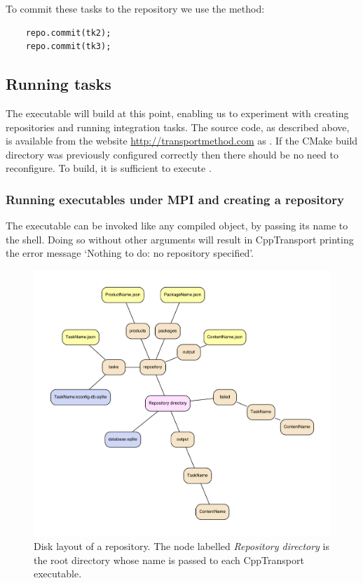 \documentclass[11pt,a4paper]{article}
\renewcommand{\texttt}[1]{{\ttfamily\fontseries{l}\selectfont{#1}}}
\newcommand{\packagefont}{\sffamily}
\newcommand{\CppTransport}{{\packagefont CppTransport}}
\newcommand{\CMake}{{\packagefont CMake}}
\newcommand{\file}[1]{\texttt{{#1}}}
\begin{document}
To commit these tasks to the repository we use the
\texttt{commit()} method:
\begin{verbatim}
    repo.commit(tk2);
    repo.commit(tk3);    
\end{verbatim}

\subsection{Running tasks}
The executable will build at this point, enabling us to experiment
with creating repositories and running integration tasks.
The source code, as described above, is available from the
website \url{http://transportmethod.com} as
\file{dquad\_A.cpp}.
If the {\CMake} build directory was previously
configured correctly then there should be no need
to reconfigure.
To build, it is sufficient to execute
\texttt{make}.

\subsubsection{Running executables under MPI and creating a repository}
The \file{dquad} executable can be invoked like any compiled object, by
passing its name to the shell.
Doing so without other arguments
will result in {\CppTransport} printing the error message
`Nothing to do: no repository specified'.
\begin{figure}
    \begin{center}
        \includegraphics[scale=0.7]{Diagrams/repo}   
    \end{center}
    \caption{\label{fig:repo-layout}Disk layout of a repository. The node
    labelled \emph{Repository directory} is the root directory whose name
    is passed to each {\CppTransport} executable.}
\end{figure}
\end{document}
